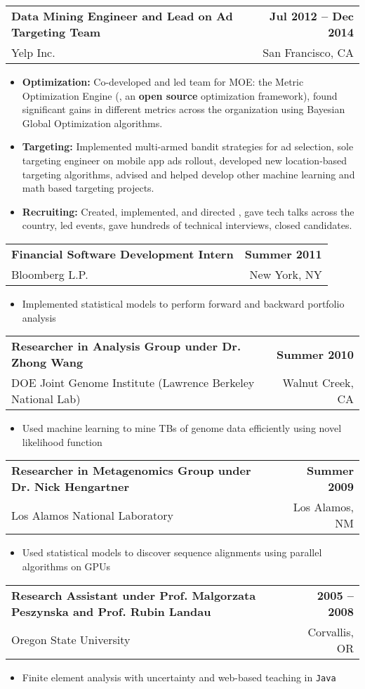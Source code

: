 \documentclass[letterpaper, 11pt]{article}
\makeatletter
\newcommand{\entry}[4]{%
  \begin{tabularx}{\linewidth}{@{}Xr@{}}
    \textbf{#2} & \textbf{#1} \\
    #3          & #4          \\
  \end{tabularx}
}
\makeatother
\begin{document}
  \entry{Jul 2012 -- Dec 2014}{Data Mining Engineer and Lead on Ad Targeting Team}{Yelp Inc.}{San Francisco, CA}
  \begin{itemize}
    \item{\textbf{Optimization:} Co-developed and led team for MOE: the Metric Optimization Engine (, an \textbf{open source} optimization framework), found significant gains in different metrics across the organization using Bayesian Global Optimization algorithms.}
    \item{\textbf{Targeting:} Implemented multi-armed bandit strategies for ad selection, sole targeting engineer on mobile app ads rollout, developed new location-based targeting algorithms, advised and helped develop other machine learning and math based targeting projects.}
    \item{\textbf{Recruiting:} Created, implemented, and directed , gave tech talks across the country, led events, gave hundreds of technical interviews, closed candidates.}
  \end{itemize}

  \entry{Summer 2011}{Financial Software Development Intern}{Bloomberg L.P.}{New York, NY}
  \begin{itemize}
    \item{Implemented statistical models to perform forward and backward portfolio analysis}
  \end{itemize}

  \entry{Summer 2010}{Researcher in Analysis Group under Dr. Zhong Wang}{DOE Joint Genome Institute (Lawrence Berkeley National Lab)}{Walnut Creek, CA}
  \begin{itemize}
    \item{Used machine learning to mine TBs of genome data efficiently using novel likelihood function}
  \end{itemize}

  \entry{Summer 2009}{Researcher in Metagenomics Group under Dr. Nick Hengartner}{Los Alamos National Laboratory}{Los Alamos, NM}
  \begin{itemize}
    \item{Used statistical models to discover sequence alignments using parallel algorithms on GPUs}
  \end{itemize}

  \entry{2005 -- 2008}{Research Assistant under Prof. Malgorzata Peszynska and Prof. Rubin Landau}{Oregon State University}{Corvallis, OR}
  \begin{itemize}
    \item{Finite element analysis with uncertainty and web-based teaching in \texttt{Java}}
  \end{itemize}
\end{document}
